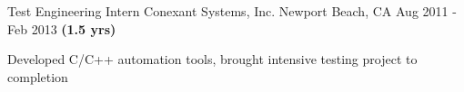 \begin{cventries}
  \cventry
    {Test Engineering Intern} %
    {Conexant Systems, Inc.} %
    {Newport Beach, CA} %
    {Aug 2011 - Feb 2013 \textbf{(1.5 yrs)}} %
    {
      \begin{cvitems} %
        \item {Developed C/C++ automation tools, brought intensive testing project to completion}
      \end{cvitems}
    }

\end{cventries}
